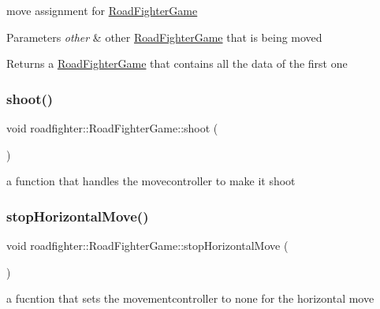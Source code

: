 move assignment for \hyperlink{classroadfighter_1_1RoadFighterGame}{Road\+Fighter\+Game} 
\begin{DoxyParams}{Parameters}
{\em other} & other \hyperlink{classroadfighter_1_1RoadFighterGame}{Road\+Fighter\+Game} that is being moved \\
\hline
\end{DoxyParams}
\begin{DoxyReturn}{Returns}
a \hyperlink{classroadfighter_1_1RoadFighterGame}{Road\+Fighter\+Game} that contains all the data of the first one 
\end{DoxyReturn}
\mbox{\label{classroadfighter_1_1RoadFighterGame_a2776c4c29f08c2435cb2e35dfba1bf74}} 
\subsubsection{\texorpdfstring{shoot()}{shoot()}}
{\footnotesize\ttfamily void roadfighter\+::\+Road\+Fighter\+Game\+::shoot (\begin{DoxyParamCaption}{ }\end{DoxyParamCaption})}

a function that handles the movecontroller to make it shoot \mbox{\label{classroadfighter_1_1RoadFighterGame_a712030e123bd2fbaa7b02144229540bf}} 
\subsubsection{\texorpdfstring{stop\+Horizontal\+Move()}{stopHorizontalMove()}}
{\footnotesize\ttfamily void roadfighter\+::\+Road\+Fighter\+Game\+::stop\+Horizontal\+Move (\begin{DoxyParamCaption}{ }\end{DoxyParamCaption})}

a fucntion that sets the movementcontroller to none for the horizontal move \mbox{\label{classroadfighter_1_1RoadFighterGame_a1e44b4f8942d91413920fffbd5a8b13c}} 
